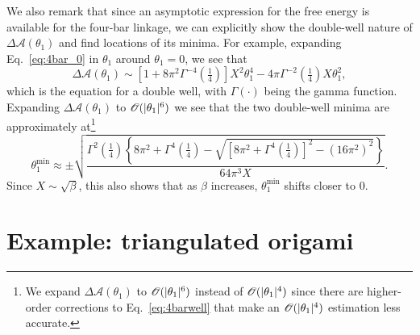 We also remark that since an asymptotic expression for the free energy is available for the four-bar linkage, we can explicitly show the double-well nature of $\Delta\mathscr{A}(\theta_{1})$ and find locations of its minima.
For example, expanding Eq.~\eqref{eq:4bar_0} in $\theta_{1}$ around $\theta_{1} = 0$, we see that
%
\begin{equation}
  \Delta\mathscr{A}(\theta_{1}) \sim \left[1 + 8\pi^{2}\Gamma^{-4}\left(\tfrac{1}{4}\right)\right]X^{2}\theta_{1}^{4} - 4\pi\Gamma^{-2}\left(\tfrac{1}{4}\right)X\theta_{1}^{2},\label{eq:4barwell}
\end{equation}
%
which is the equation for a double well, with $\Gamma(\cdot)$ being the gamma function.
Expanding $\Delta\mathscr{A}(\theta_{1})$ to $\mathscr{O}(\lvert\theta_{1}\rvert^{6})$ we see that the two double-well minima are approximately at\footnote{We expand $\Delta\mathscr{A}(\theta_{1})$ to $\mathscr{O}(\lvert\theta_{1}\rvert^{6})$ instead of $\mathscr{O}(\lvert\theta_{1}\rvert^{4})$ since there are higher-order corrections to Eq.~\eqref{eq:4barwell} that make an $\mathscr{O}(\lvert\theta_{1}\rvert^{4})$ estimation less accurate.}
%
\begin{equation}
  \theta_{1}^{\text{min}} \approx \pm \sqrt{\frac{\Gamma^{2}\left(\frac{1}{4}\right)\left\{8\pi^{2} + \Gamma^{4}\left(\frac{1}{4}\right) - \sqrt{\left[8\pi^{2} + \Gamma^{4}\left(\frac{1}{4}\right)\right]^{2} - (16\pi^{2})^{2}}\right\}}{64\pi^{3}X}}.
  \label{eq:thetamin}
\end{equation}
%
Since $X \sim \sqrt{\beta}$, this also shows that as $\beta$ increases, $\theta_{1}^{\text{min}}$ shifts closer to $0$.

\section{Example: triangulated origami}
\label{sec:origami}

